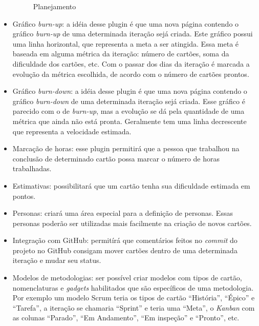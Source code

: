 \begin{itemize}
{	\begin{figure}[H]
	  \centering
	  \caption{Planejamento}\label{figura:planejamento}
	\end{figure}
	}
	\item{Gráfico \textit{burn-up}: a idéia desse plugin é que uma nova página contendo o gráfico \textit{burn-up} de uma determinada iteração sejá criada. Este gráfico possui uma linha horizontal, que representa a meta a ser atingida. Essa meta é baseada em alguma métrica da iteração: número de cartões, soma da dificuldade dos cartões, etc. Com o passar dos dias da iteração é marcada a evolução da métrica escolhida, de acordo com o número de cartões prontos.}
	\item{Gráfico \textit{burn-down}: a idéia desse plugin é que uma nova página contendo o gráfico \textit{burn-down} de uma determinada iteração sejá criada. Esse gráfico é parecido com o de \textit{burn-up}, mas a evolução se dá pela quantidade de uma métrica que ainda não está pronta. Geralmente tem uma linha decrescente que representa a velocidade estimada.}
	\item{Marcação de horas: esse plugin permitirá que a pessoa que trabalhou na conclusão de determinado cartão possa marcar o número de horas trabalhadas.}
	\item{Estimativas: possibilitará que um cartão tenha sua dificuldade estimada em pontos.}
	\item{Personas: criará uma área especial para a definição de personas. Essas personas poderão ser utilizadas mais facilmente na criação de novos cartões.}
	\item{Integração com GitHub: permitírá que comentários feitos no \textit{commit} do projeto no GitHub consigam mover cartões dentro de uma determinada iteração e mudar seu status.}
	\item{Modelos de metodologias: ser possível criar modelos com tipos de cartão, nomenclaturas e \textit{gadgets} habilitados que são específicos de uma metodologia. Por exemplo um modelo Scrum teria os tipos de cartão ``História'', ``Épico'' e ``Tarefa'', a iteração se chamaria ``Sprint'' e teria uma ``Meta'', o \textit{Kanban} com as colunas ``Parado'', ``Em Andamento'', ``Em inspeção'' e ``Pronto'', etc.  }
\end{itemize}
